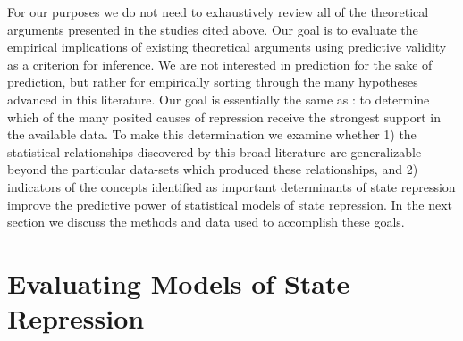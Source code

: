 \documentclass[11pt]{article}
\begin{document}
For our purposes we do not need to exhaustively review all of the theoretical arguments presented in the studies cited above. Our goal is to evaluate the empirical implications of existing theoretical arguments using predictive validity as a criterion for inference. We are not interested in prediction for the sake of prediction, but rather for empirically sorting through the many hypotheses advanced in this literature. Our goal is essentially the same as \citet{PoeTate1994}: to determine which of the many posited causes of repression receive the strongest support in the available data. To make this determination we examine whether 1) the statistical relationships discovered by this broad literature are generalizable beyond the particular data-sets which produced these relationships, and 2) indicators of the concepts identified as important determinants of state repression improve the predictive power of statistical models of state repression. In the next section we discuss the methods and data used to accomplish these goals.

\section*{Evaluating Models of State Repression}
 
\end{document}
